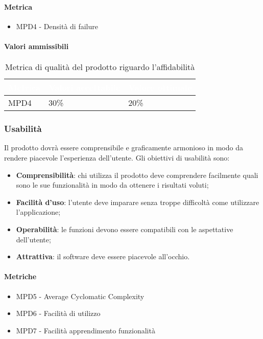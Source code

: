\paragraph{Metrica}
\begin{itemize}
\item MPD4 - Densità di failure
\end{itemize}
\paragraph{Valori ammissibili}
\renewcommand{\arraystretch}{1.5}
\begin{longtable}{C{2.5cm} C{4cm} C{4cm}}
\textcolor{white}{\textbf{Metrica}}&
\textcolor{white}{\textbf{Valori accettabile}}&
\textcolor{white}{\textbf{Valore ottimale}}\\	
\endhead
\endfoot
{}\caption{Metrica di qualità del prodotto riguardo l'affidabilità}
\endlastfoot
		MPD4 &  
		30\% &
		20\% \\
\end{longtable}
\subsubsection{Usabilità}
Il prodotto dovrà essere comprensibile e graficamente armonioso in modo da rendere piacevole l'esperienza dell'utente. Gli obiettivi di usabilità sono:
\begin{itemize}
\item \textbf{Comprensibilità}: chi utilizza il prodotto deve comprendere facilmente quali sono le sue funzionalità in modo da ottenere i risultati voluti;
\item \textbf{Facilità d'uso}: l'utente deve imparare senza troppe difficoltà come utilizzare l'applicazione;
\item \textbf{Operabilità}: le funzioni devono essere compatibili con le aspettative dell'utente;
\item \textbf{Attrattiva}: il software deve essere piacevole all'occhio.
\end{itemize} 
\paragraph{Metriche}
\begin{itemize}
\item MPD5 - Average Cyclomatic Complexity
\item MPD6 - Facilità di utilizzo
\item MPD7 - Facilità apprendimento funzionalità
\end{itemize}
